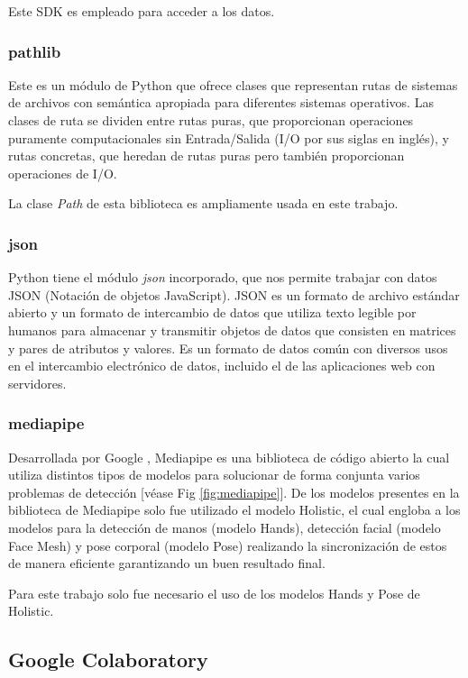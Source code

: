 Este SDK es empleado para acceder a los datos.

\subsubsection{pathlib}
Este es un módulo de Python que ofrece clases que representan rutas de sistemas de archivos con semántica apropiada para diferentes sistemas operativos. Las clases de ruta se dividen entre rutas puras, que proporcionan operaciones puramente computacionales sin Entrada/Salida (I/O por sus siglas en inglés), y rutas concretas, que heredan de rutas puras pero también proporcionan operaciones de I/O.

La clase \textit{Path} de esta biblioteca es ampliamente usada en este trabajo.

\subsubsection{json}
Python tiene el módulo \textit{json} incorporado, que nos permite trabajar con datos JSON (Notación de objetos JavaScript).
JSON es un formato de archivo estándar abierto y un formato de intercambio de datos que utiliza texto legible por humanos para almacenar y transmitir objetos de datos que consisten en matrices y pares de atributos y valores. Es un formato de datos común con diversos usos en el intercambio electrónico de datos, incluido el de las aplicaciones web con servidores.

\subsubsection{mediapipe}
Desarrollada por Google , Mediapipe es una biblioteca de código abierto la cual utiliza distintos tipos de modelos para solucionar de forma conjunta varios problemas de detección [véase Fig \ref{fig:mediapipe}]. De los modelos presentes en la biblioteca de Mediapipe solo fue utilizado el modelo Holistic, el cual engloba a los modelos para la detección de manos (modelo Hands), detección facial (modelo Face Mesh) y pose corporal (modelo Pose) realizando la sincronización de estos de manera eficiente garantizando un buen resultado final.

Para este trabajo solo fue necesario el uso de los modelos Hands y Pose de Holistic.

\subsection{Google Colaboratory}

